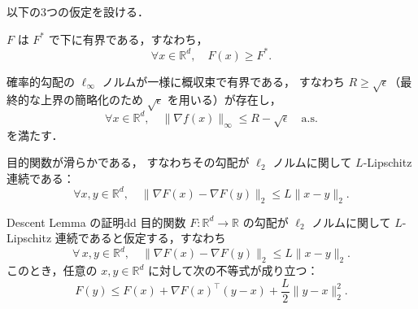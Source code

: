\documentclass[dvipdfmx,a4paper,11pt]{jsarticle}
\begin{document}
以下の3つの仮定を設ける．

\begin{assumption}[目的関数の下有界性]
$F$ は $F^*$ で下に有界である，すなわち，
\begin{equation}
    \forall x \in \mathbb{R}^d,\quad F(x) \geq F^*.
    \label{eq:bounded_below}
\end{equation}
\end{assumption}

\begin{assumption}[確率的勾配の一様有界性]
確率的勾配の $\ell_\infty$ ノルムが一様に概収束で有界である，
すなわち $R \geq \sqrt{\epsilon}$（最終的な上界の簡略化のため $\sqrt{\epsilon}$ を用いる）が存在し，
\begin{equation}
    \forall x \in \mathbb{R}^d,\quad
    \|\nabla f(x)\|_\infty \leq R - \sqrt{\epsilon}
    \quad \text{a.s.}
    \label{eq:grad_bound}
\end{equation}
を満たす．
\end{assumption}

\begin{assumption}[目的関数の滑らかさ]
目的関数が滑らかである，
すなわちその勾配が $\ell_2$ ノルムに関して $L$-Lipschitz 連続である：
\begin{equation}
    \forall x, y \in \mathbb{R}^d,\quad
    \|\nabla F(x) - \nabla F(y)\|_2 \leq L \|x - y\|_2.
    \label{eq:smoothness}
\end{equation}
\end{assumption}
\begin{reidai}{Descent Lemma の証明}{dd}
目的関数 $F : \mathbb{R}^d \to \mathbb{R}$ の勾配が $\ell_2$ ノルムに関して
$L$-Lipschitz 連続であると仮定する，すなわち
\begin{equation}
    \forall\, x, y \in \mathbb{R}^d, \quad
    \|\nabla F(x) - \nabla F(y)\|_2 \leq L\|x - y\|_2.
    \label{eq:L-smooth}
\end{equation}
このとき，任意の $x, y \in \mathbb{R}^d$ に対して次の不等式が成り立つ：
\begin{equation}
    F(y) \leq F(x) + \nabla F(x)^\top (y - x) + \frac{L}{2}\|y - x\|_2^2.
    \label{eq:descent_lemma}
\end{equation}
\end{reidai}
\end{document}
